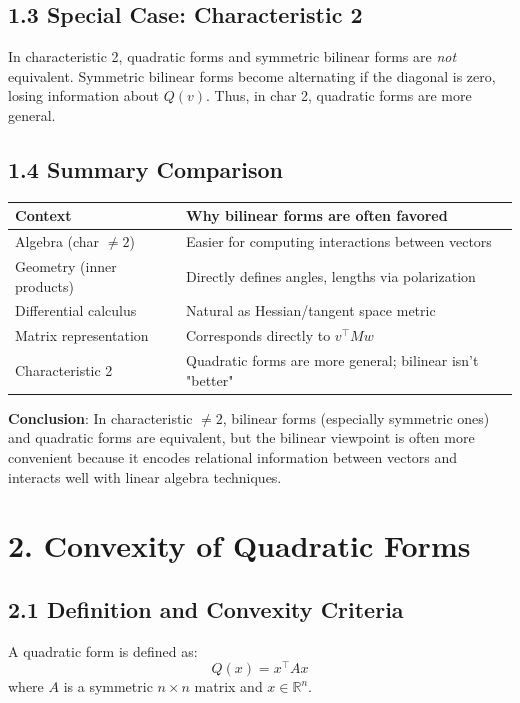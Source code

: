 \documentclass{article}
\begin{document}
\subsection*{1.3 Special Case: Characteristic 2}
In characteristic 2, quadratic forms and symmetric bilinear forms are \textit{not} equivalent. Symmetric bilinear forms become alternating if the diagonal is zero, losing information about $Q(v)$. Thus, in char 2, quadratic forms are more general.

\subsection*{1.4 Summary Comparison}
\begin{center}
\begin{tabular}{@{}ll@{}}
\toprule
\textbf{Context} & \textbf{Why bilinear forms are often favored} \\
\midrule
Algebra (char $\neq 2$) & Easier for computing interactions between vectors \\
Geometry (inner products) & Directly defines angles, lengths via polarization \\
Differential calculus & Natural as Hessian/tangent space metric \\
Matrix representation & Corresponds directly to $v^\top M w$ \\
Characteristic 2 & Quadratic forms are more general; bilinear isn't "better" \\
\bottomrule
\end{tabular}
\end{center}

\textbf{Conclusion}: In characteristic $\neq 2$, bilinear forms (especially symmetric ones) and quadratic forms are equivalent, but the bilinear viewpoint is often more convenient because it encodes relational information between vectors and interacts well with linear algebra techniques.

\section*{2. Convexity of Quadratic Forms}

\subsection*{2.1 Definition and Convexity Criteria}
A quadratic form is defined as:
\[
Q(x) = x^\top A x
\]
where $A$ is a symmetric $n \times n$ matrix and $x \in \mathbb{R}^n$.
\end{document}
